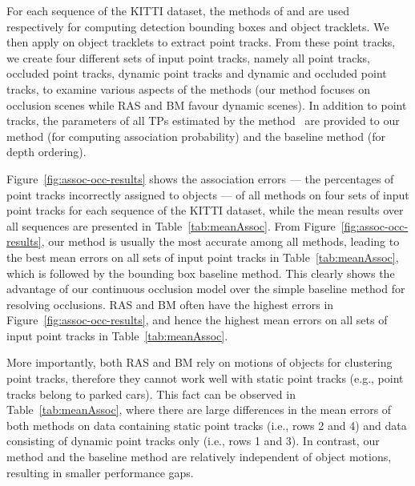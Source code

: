 For each sequence of the KITTI dataset, the methods of \cite{Felzenszwalb_etal_2010} and \cite{Choi_Savarese_2010} are used respectively for computing detection bounding boxes and object tracklets. We then apply \cite{Zach2007} on object tracklets to extract point tracks. From these point tracks, we create four different sets of input point tracks, namely all point tracks, occluded point tracks, dynamic point tracks and dynamic and occluded point tracks, to examine various aspects of the methods (our method focuses on occlusion scenes while RAS and BM favour dynamic scenes). In addition to point tracks, the parameters of all TPs estimated by the method~\cite{Song_Chandraker_2014} are provided to our method (for computing association probability) and the baseline method (for depth ordering).

Figure~\ref{fig:assoc-occ-results} shows the association errors --- the percentages of point tracks incorrectly assigned to objects --- of all methods on four sets of input point tracks for each sequence of the KITTI dataset, while the mean results over all sequences are presented in Table~\ref{tab:meanAssoc}. From Figure~\ref{fig:assoc-occ-results}, our method is usually the most accurate among all methods, leading to the best mean errors on all sets of input point tracks in Table~\ref{tab:meanAssoc}, which is followed by the bounding box baseline method. This clearly shows the advantage of our continuous occlusion model over the simple baseline method for resolving occlusions. RAS and BM often have the highest errors in Figure~\ref{fig:assoc-occ-results}, and hence the highest mean errors on all sets of input point tracks in Table~\ref{tab:meanAssoc}. 

More importantly, both RAS and BM rely on motions of objects for clustering point tracks, therefore they cannot work well with static point tracks (e.g., point tracks belong to parked cars). This fact can be observed in Table~\ref{tab:meanAssoc}, where there are large differences in the mean errors of both methods on data containing static point tracks (i.e., rows 2 and 4) and data consisting of dynamic point tracks only (i.e., rows 1 and 3). In contrast, our method and the baseline method are relatively independent of object motions, resulting in smaller performance gaps.

